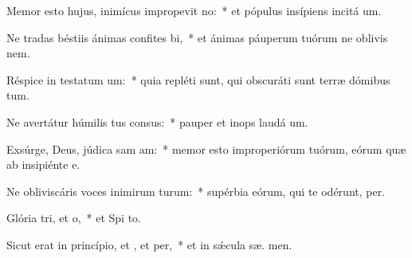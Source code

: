 \item Memor esto hujus, inimícus impropevit no:~* et pópulus insípiens incitá  um.
\item Ne tradas béstiis ánimas confites bi,~* et ánimas páuperum tuórum ne oblivis  nem.
\item Réspice in testatum um:~* quia repléti sunt, qui obscuráti sunt terræ dómibus tum.
\item Ne avertátur húmilis tus consus:~* pauper et inops laudá  um.
\item Exsúrge, Deus, júdica sam am:~* memor esto improperiórum tuórum, eórum quæ ab insipiénte   e.
\item Ne obliviscáris voces inimirum turum:~* supérbia eórum, qui te odérunt,  per.
\item Glória tri, et o,~* et Spi to.
\item Sicut erat in princípio, et , et per,~* et in sǽcula sæ. men.

